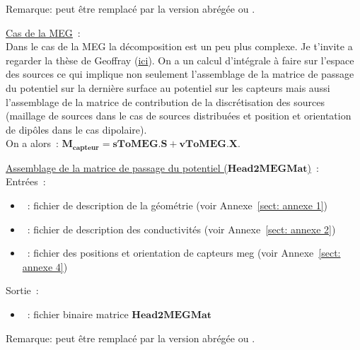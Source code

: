 \medskip

\noindent
{}
\medskip
Remarque:  peut être remplacé par la version abrégée  ou .

\bigskip

\checkItem \underline{Cas de la MEG}~:\\
Dans le cas de la MEG la décomposition est un peu plus complexe. Je t'invite a regarder la thèse de Geoffray
(\href{http://pastel.paristech.org/1593/}{ici}). On a un calcul d'intégrale à faire sur l'espace des sources ce qui implique non
seulement l'assemblage de la matrice de passage du potentiel sur la dernière surface au potentiel sur les capteurs mais aussi
l'assemblage de la matrice de contribution de la discrétisation des sources (maillage de sources dans le cas de sources
distribuées et position et orientation de dipôles dans le cas dipolaire).\\
On a alors~: $\mathbf{M_{capteur}} = \mathbf{sToMEG} . \mathbf{S} + \mathbf{vToMEG}.\mathbf{X}$.

\medskip

\noindent
\underline{Assemblage de la matrice de passage du potentiel ($\mathbf{Head2MEGMat}$)}~:\\
Entrées~:
\begin{itemize}
    \item {}~: fichier de description de la géométrie (voir Annexe~\ref{sect: annexe 1})
    \item {}~: fichier de description des conductivités (voir Annexe~\ref{sect: annexe 2})
    \item {}~: fichier des positions et orientation de capteurs meg (voir Annexe~\ref{sect: annexe 4})
\end{itemize}
Sortie~:
\begin{itemize}
    \item {}~: fichier binaire matrice $\mathbf{Head2MEGMat}$
\end{itemize}

\medskip

\noindent
{}
\medskip
Remarque:  peut être remplacé par la version abrégée  ou .

